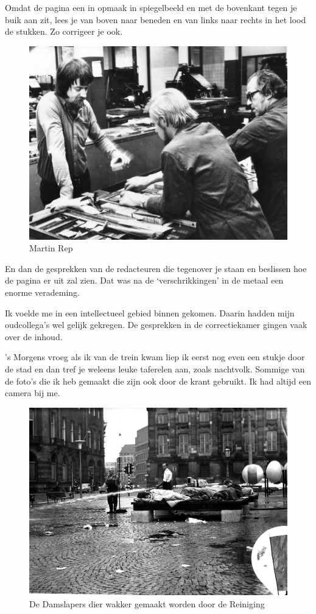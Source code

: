 \documentclass[10pt,twoside, openright]{memoir}
\begin{document}
Omdat de pagina een in opmaak in spiegelbeeld en met de bovenkant tegen je buik aan zit, lees je van boven naar beneden en van links naar rechts in het lood de stukken. Zo corrigeer je ook. 

\begin{figure}
\includegraphics[width=\textwidth]{img/ch39/Opmaak2}
\caption*{\footnotesize Martin Rep}
\end{figure}

En dan de gesprekken van de redacteuren die tegenover je staan en beslissen hoe de pagina er uit zal zien. Dat was na de `verschrikkingen' in de metaal een enorme verademing.

Ik voelde me in een intellectueel gebied binnen gekomen. Daarin hadden mijn oudcollega’s wel gelijk gekregen. De gesprekken in de correctiekamer gingen vaak over de inhoud. 

’s Morgens vroeg als ik van de trein kwam liep ik eerst nog even een stukje door de stad en dan tref je weleens leuke taferelen aan, zoals nachtvolk. Sommige van de foto’s die ik heb gemaakt die zijn ook door de krant gebruikt. Ik had altijd een camera bij me.

\begin{figure}
\includegraphics[width=\textwidth]{img/ch39/snurk}
\caption*{\footnotesize De Damslapers dier wakker gemaakt worden door de Reiniging}
\end{figure}
\end{document}
